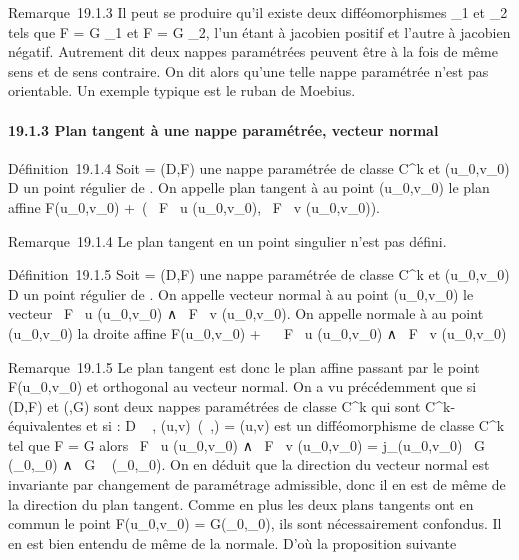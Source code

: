 \documentclass[]{article}
\begin{document}
Remarque~19.1.3 Il peut se produire qu'il existe deux difféomorphismes
\theta_1 et \theta_2 tels que F = G \cdot \theta_1 et F = G \cdot
\theta_2, l'un étant à jacobien positif et l'autre à jacobien
négatif. Autrement dit deux nappes paramétrées peuvent être à la fois de
même sens et de sens contraire. On dit alors qu'une telle nappe
paramétrée n'est pas orientable. Un exemple typique est le ruban de
Moebius.

\paragraph{19.1.3 Plan tangent à une nappe paramétrée, vecteur normal}

Définition~19.1.4 Soit \Gamma = (D,F) une nappe paramétrée de classe
C^k et (u_0,v_0) \in D un point régulier de
\Sigma. On appelle plan tangent à \Sigma au point (u_0,v_0) le
plan affine F(u_0,v_0) +\
\mathrmVect( \partial~F \over \partial~u
(u_0,v_0), \partial~F \over \partial~v
(u_0,v_0)).

Remarque~19.1.4 Le plan tangent en un point singulier n'est pas défini.

Définition~19.1.5 Soit \Sigma = (D,F) une nappe paramétrée de classe
C^k et (u_0,v_0) \in D un point régulier de
\Sigma. On appelle vecteur normal à \Sigma au point (u_0,v_0) le
vecteur  \partial~F \over \partial~u (u_0,v_0) ∧
\partial~F \over \partial~v (u_0,v_0). On appelle
normale à \Sigma au point (u_0,v_0) la droite affine
F(u_0,v_0) + ~ \partial~F \over \partial~u
(u_0,v_0) ∧ \partial~F \over \partial~v
(u_0,v_0)

Remarque~19.1.5 Le plan tangent est donc le plan affine passant par le
point F(u_0,v_0) et orthogonal au vecteur normal. On a
vu précédemment que si (D,F) et (\Delta,G) sont deux nappes paramétrées de
classe C^k qui sont C^k-équivalentes et si \theta : D \rightarrow~
\Delta, (u,v)\mapsto~(\lambda~,\mu) = \theta(u,v) est un
difféomorphisme de classe C^k tel que F = G \cdot \theta alors  \partial~F
\over \partial~u (u_0,v_0) ∧ \partial~F
\over \partial~v (u_0,v_0) =
j_\theta(u_0,v_0) \partial~G \over \partial~\lambda~
(\lambda_0,\mu_0) ∧ \partial~G \over \partial~\mu
(\lambda_0,\mu_0). On en déduit que la direction du vecteur
normal est invariante par changement de paramétrage admissible, donc il
en est de même de la direction du plan tangent. Comme en plus les deux
plans tangents ont en commun le point F(u_0,v_0) =
G(\lambda_0,\mu_0), ils sont nécessairement confondus. Il en
est bien entendu de même de la normale. D'où la proposition suivante
\end{document}
